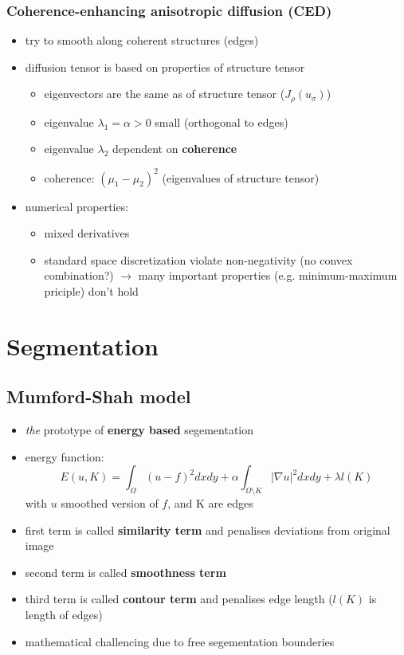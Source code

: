 \documentclass[11pt]{article}
\begin{document}
\subsubsection{Coherence-enhancing anisotropic diffusion (CED)}
\label{sec-7-2-2}
\begin{itemize}
\item try to smooth along coherent structures (edges)
\item diffusion tensor is based on properties of structure tensor
\begin{itemize}
\item eigenvectors are the same as of structure tensor ($J_\rho(u_\sigma)$)
\item eigenvalue $\lambda_1 = \alpha >0$ small (orthogonal to edges)
\item eigenvalue $\lambda_2$ dependent on \textbf{coherence}
\item coherence: $(\mu_1 - \mu_2)^2$ (eigenvalues of structure tensor)
\end{itemize}
\item numerical properties:
\begin{itemize}
\item mixed derivatives
\item standard space discretization violate non-negativity (no convex combination?)
        $\rightarrow$ many important properties (e.g. minimum-maximum priciple) don't hold
\end{itemize}
\end{itemize}

\section{Segmentation}
\label{sec-8}
\subsection{Mumford-Shah model}
\label{sec-8-1}
\begin{itemize}
\item \emph{the} prototype of \textbf{energy based} segementation
\item energy function:
\[ E(u,K) = \int_\Omega (u-f)^2 dxdy + \alpha \int_{\Omega\setminus K} |\nabla u|^2
        dx dy + \lambda l(K) \]
with $u$ smoothed version of $f$, and K are edges
\item first term is called \textbf{similarity term} and penalises deviations from original image
\item second term is called \textbf{smoothness term}
\item third term is called \textbf{contour term} and penalises edge length ($l(K)$ is length of edges)
\item mathematical challencing due to free segementation bounderies
\end{itemize}
\end{document}
